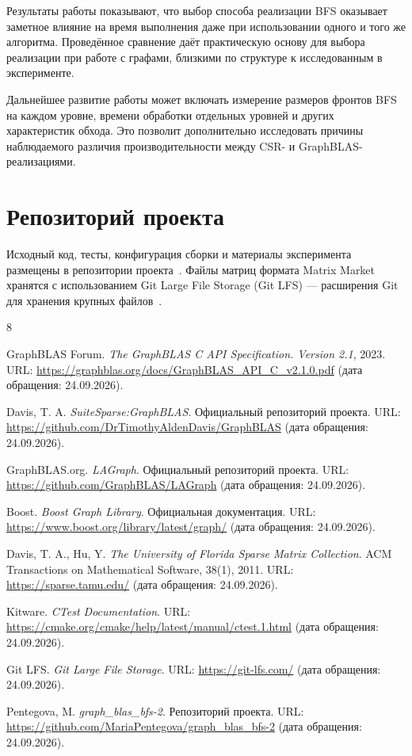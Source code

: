 \documentclass[a4paper,10pt]{article}
\begin{document}
Результаты работы показывают, что выбор способа реализации BFS
оказывает заметное влияние на время выполнения даже при использовании
одного и того же алгоритма. Проведённое сравнение даёт практическую
основу для выбора реализации при работе с графами, близкими по
структуре к исследованным в эксперименте.

Дальнейшее развитие работы может включать измерение размеров фронтов
BFS на каждом уровне, времени обработки отдельных уровней и других
характеристик обхода. Это позволит дополнительно исследовать причины
наблюдаемого различия производительности между CSR- и
GraphBLAS-реализациями.


\section*{Репозиторий проекта}

Исходный код, тесты, конфигурация сборки и материалы эксперимента
размещены в репозитории проекта~\cite{repository}. Файлы матриц
формата Matrix Market хранятся с использованием Git Large File Storage
(Git LFS) --- расширения Git для хранения крупных файлов~\cite{git-lfs}.

\begin{thebibliography}{8}

\setlength{\itemsep}{0.05em}
\setlength{\parskip}{0pt}

GraphBLAS Forum.
\textit{The GraphBLAS C API Specification. Version 2.1}, 2023.
URL: \url{https://graphblas.org/docs/GraphBLAS_API_C_v2.1.0.pdf}
(дата обращения: 24.09.2026).

Davis, T. A.
\textit{SuiteSparse:GraphBLAS}.
Официальный репозиторий проекта.
URL: \url{https://github.com/DrTimothyAldenDavis/GraphBLAS}
(дата обращения: 24.09.2026).

GraphBLAS.org.
\textit{LAGraph}.
Официальный репозиторий проекта.
URL: \url{https://github.com/GraphBLAS/LAGraph}
(дата обращения: 24.09.2026).

Boost.
\textit{Boost Graph Library}.
Официальная документация.
URL: \url{https://www.boost.org/library/latest/graph/}
(дата обращения: 24.09.2026).

Davis, T. A., Hu, Y.
\textit{The University of Florida Sparse Matrix Collection}.
ACM Transactions on Mathematical Software, 38(1), 2011.
URL: \url{https://sparse.tamu.edu/}
(дата обращения: 24.09.2026).

Kitware.
\textit{CTest Documentation}.
URL: \url{https://cmake.org/cmake/help/latest/manual/ctest.1.html}
(дата обращения: 24.09.2026).

Git LFS.
\textit{Git Large File Storage}.
URL: \url{https://git-lfs.com/}
(дата обращения: 24.09.2026).

Pentegova, M.
\textit{graph\_blas\_bfs-2}.
Репозиторий проекта.
URL: \url{https://github.com/MariaPentegova/graph_blas_bfs-2}
(дата обращения: 24.09.2026).

\end{thebibliography}
\end{document}
